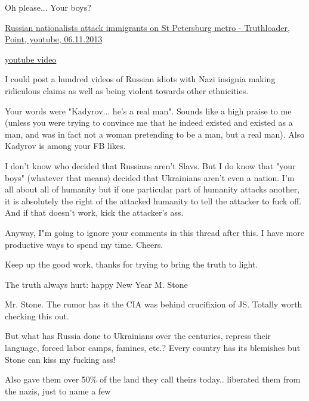 \begin{itemize}
\begin{itemize}
Oh please... Your boys? 

\href{https://www.youtube.com/watch?v=klkyfbnS0TA}{%
Russian nationalists attack immigrants on St Petersburg metro - Truthloader, Point, youtube, 06.11.2013%
}


\href{https://www.youtube.com/watch?v=zOZXxujwBic}{%
youtube video%
}


I could post a hundred videos of Russian idiots with Nazi insignia making
ridiculous claims as well as being violent towards other ethnicities.

Your words were "Kadyrov... he's a real man". Sounds like a high praise to me
(unless you were trying to convince me that he indeed existed and existed as a
man, and was in fact not a woman pretending to be a man, but a real man). Also
Kadyrov is among your FB likes.

I don't know who decided that Russians aren't Slavs. But I do know that "your
boys" (whatever that means) decided that Ukrainians aren't even a nation. I'm
all about all of humanity but if one particular part of humanity attacks
another, it is absolutely the right of the attacked humanity to tell the
attacker to fuck off. And if that doesn't work, kick the attacker's ass.

Anyway, I"m going to ignore your comments in this thread after this. I have
more productive ways to spend my time. Cheers.

\end{itemize} %

Keep up the good work, thanks for trying to bring the truth to light.

The truth always hurt: happy New Year M. Stone

Mr. Stone. The rumor has it the CIA was behind crucifixion of JS. Totally worth checking this out.


But what has Russia done to Ukrainians over the centuries, repress their
language, forced labor camps, famines, etc.? Every country has its blemishes
but Stone can kiss my fucking ass!

\begin{itemize} %
Also gave them over 50\% of the land they call theirs today.. liberated them from the nazis, just to name a few


\end{itemize}
\end{itemize}
